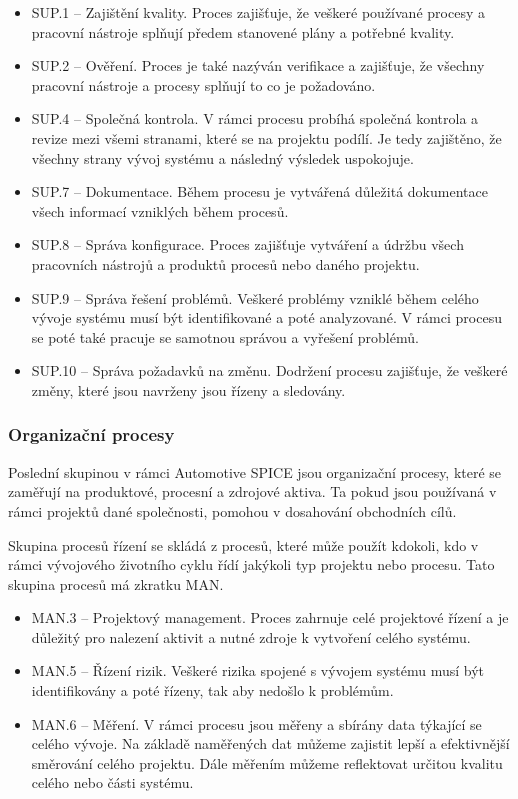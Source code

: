 \documentclass[czech,master,public,dept460,male,cpdeclaration,oneside]{diploma}
\begin{document}
\begin{itemize}
	\item SUP.1 -- Zajištění kvality. Proces zajišťuje, že veškeré používané procesy a pracovní nástroje splňují předem stanovené plány a potřebné kvality.
	\item SUP.2 -- Ověření. Proces je také nazýván verifikace a zajišťuje, že všechny pracovní nástroje a procesy splňují to co je požadováno.
	\item SUP.4 -- Společná kontrola. V rámci procesu probíhá společná kontrola a revize mezi všemi stranami, které se na projektu podílí. Je tedy zajištěno, že všechny strany vývoj systému a následný výsledek uspokojuje.
	\item SUP.7 -- Dokumentace. Během procesu je vytvářená důležitá dokumentace všech informací vzniklých během procesů.
	\item SUP.8 -- Správa konfigurace. Proces zajišťuje vytváření a údržbu všech pracovních nástrojů a produktů procesů nebo daného projektu.
	\item SUP.9 -- Správa řešení problémů. Veškeré problémy vzniklé během celého vývoje systému musí být identifikované a poté analyzované. V rámci procesu se poté také pracuje se samotnou správou a vyřešení problémů. 
	\item SUP.10 -- Správa požadavků na změnu. Dodržení procesu zajišťuje, že veškeré změny, které jsou navrženy jsou řízeny a sledovány.
\end{itemize}

\subsubsection{Organizační procesy}
Poslední skupinou v rámci Automotive SPICE jsou organizační procesy, které se zaměřují na produktové, procesní a zdrojové aktiva. Ta pokud jsou používaná v rámci projektů dané společnosti, pomohou v dosahování obchodních cílů.

Skupina procesů řízení se skládá z procesů, které může použít kdokoli, kdo v rámci vývojového životního cyklu řídí jakýkoli typ projektu nebo procesu. Tato skupina procesů má zkratku MAN.

\begin{itemize}
	\item MAN.3 -- Projektový management. Proces zahrnuje celé projektové řízení a je důležitý pro nalezení aktivit a nutné zdroje k vytvoření celého systému.
	\item MAN.5 -- Řízení rizik. Veškeré rizika spojené s vývojem systému musí být identifikovány a poté řízeny, tak aby nedošlo k problémům.
	\item MAN.6 -- Měření. V rámci procesu jsou měřeny a sbírány data týkající se celého vývoje. Na základě naměřených dat můžeme zajistit lepší a efektivnější směrování celého projektu. Dále měřením můžeme reflektovat určitou kvalitu celého nebo části systému.
\end{itemize}
\end{document}
